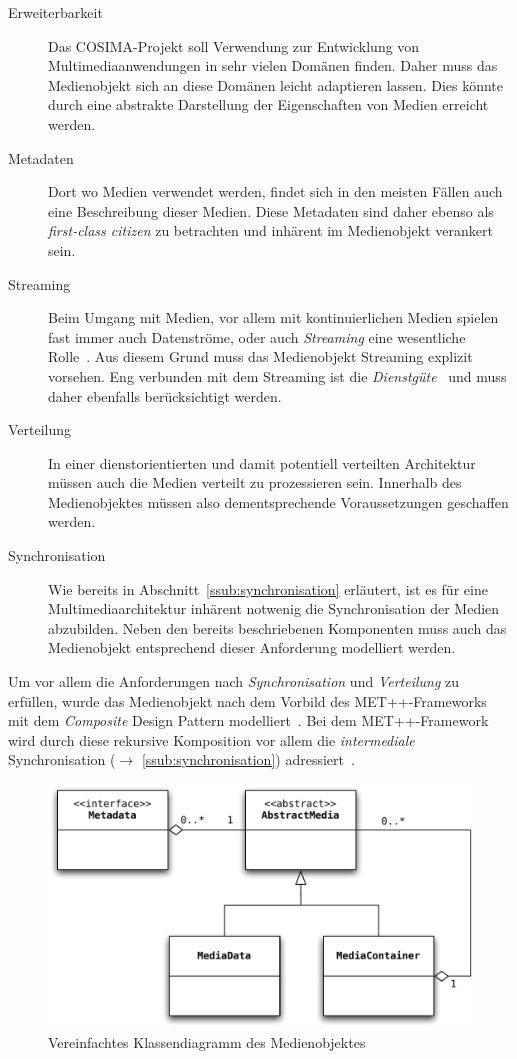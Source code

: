   \begin{description}
    \item[Erweiterbarkeit] Das COSIMA-Projekt soll Verwendung zur Entwicklung von Multimediaanwendungen in sehr vielen Domänen finden. Daher muss das Medienobjekt sich an diese Domänen leicht adaptieren lassen. Dies könnte durch eine abstrakte Darstellung der Eigenschaften von Medien erreicht werden.
    \item[Metadaten] Dort wo Medien verwendet werden, findet sich in den meisten Fällen auch eine Beschreibung dieser Medien. Diese Metadaten sind daher ebenso als \emph{first-class citizen} zu betrachten und inhärent im Medienobjekt verankert sein.
    \item[Streaming] Beim Umgang mit Medien, vor allem mit kontinuierlichen Medien spielen fast immer auch Datenströme, oder auch \emph{Streaming} eine wesentliche Rolle~\citep[S. 14ff]{multimedia_technologie}. Aus diesem Grund muss das Medienobjekt Streaming explizit vorsehen. Eng verbunden mit dem Streaming ist die \emph{Dienstgüte}~\citep{multimedia_technologie} und muss daher ebenfalls berücksichtigt werden.
    \item[Verteilung] In einer dienstorientierten und damit potentiell verteilten Architektur müssen auch die Medien verteilt zu prozessieren sein. Innerhalb des Medienobjektes müssen also dementsprechende Voraussetzungen geschaffen werden.
    \item[Synchronisation] Wie bereits in Abschnitt~\ref{ssub:synchronisation} erläutert, ist es für eine Multimediaarchitektur inhärent notwenig die Synchronisation der Medien abzubilden. Neben den bereits beschriebenen Komponenten muss auch das Medienobjekt entsprechend dieser Anforderung modelliert werden.
  \end{description}

  Um vor allem die Anforderungen nach \emph{Synchronisation} und \emph{Verteilung} zu erfüllen, wurde das Medienobjekt nach dem Vorbild des MET++-Frameworks~\citep[S. 75]{ackermann1996doo} mit dem \emph{Composite} Design Pattern modelliert~\citep[S. 163]{design_patterns}. Bei dem MET++-Framework wird durch diese rekursive Komposition vor allem die \emph{intermediale} Synchronisation ($\to$ \ref{ssub:synchronisation}) adressiert~\citep[S. 73]{ackermann1996doo}.
  
\begin{figure}[ht]
  \centering
    \includegraphics[width=.9\textwidth]{images/Medienobjekt.pdf}
  \caption{Vereinfachtes Klassendiagramm des Medienobjektes}
  \label{fig:medienobjekt}
\end{figure}

